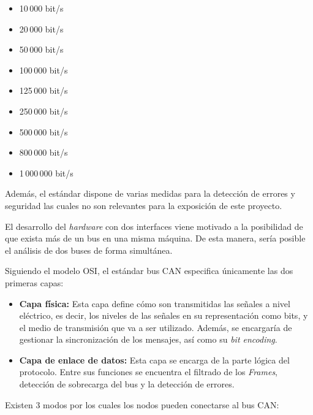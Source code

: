 \begin{itemize}
\tightlist
\item
10\,000 bit/s
\item
20\,000 bit/s
\item
50\,000 bit/s
\item
100\,000 bit/s
\item
125\,000 bit/s
\item
250\,000 bit/s
\item
500\,000 bit/s
\item
800\,000 bit/s
\item
1\,000\,000 bit/s
\end{itemize}


Además, el estándar dispone de varias medidas para la detección de errores y seguridad las cuales no son relevantes para la exposición de este proyecto.

El desarrollo del \emph{hardware} con dos interfaces viene motivado a la posibilidad de que exista más de un bus en una misma máquina. De esta manera, sería posible el análisis de dos buses de forma simultánea.

Siguiendo el modelo OSI\cite{osi:can}, el estándar bus CAN especifica únicamente las dos primeras capas:

\begin{itemize}

\item
\textbf{Capa física:} Esta capa define cómo son transmitidas las señales a nivel eléctrico, es decir, los niveles de las señales en su representación como bits, y el medio de transmisión que va a ser utilizado. Además, se encargaría de gestionar la sincronización de los mensajes, así como su \emph{bit encoding}.

\item
\textbf{Capa de enlace de datos:} Esta capa se encarga de la parte lógica del protocolo. Entre sus funciones se encuentra el filtrado de los \emph{Frames}, detección de sobrecarga del bus y la detección de errores.

\end{itemize}

Existen 3 modos por los cuales los nodos pueden conectarse al bus CAN:

